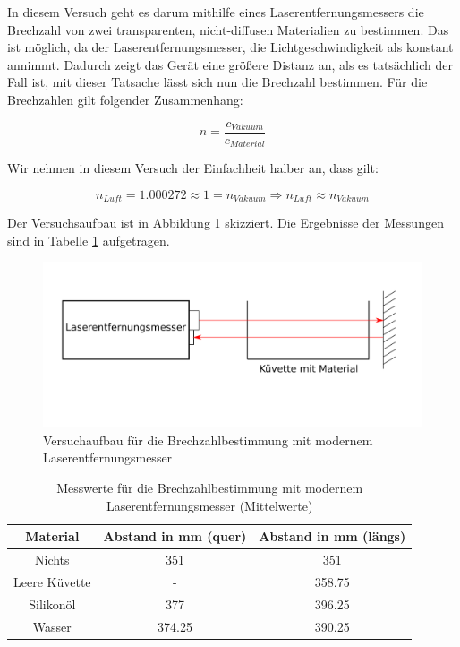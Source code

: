 In diesem Versuch geht es darum mithilfe eines Laserentfernungsmessers die Brechzahl von zwei transparenten, nicht-diffusen Materialien zu bestimmen. Das ist möglich, da der Laserentfernungsmesser, die Lichtgeschwindigkeit als konstant annimmt. Dadurch zeigt das Gerät eine größere Distanz an, als es tatsächlich der Fall ist, mit dieser Tatsache lässt sich nun die Brechzahl bestimmen. Für die Brechzahlen gilt folgender Zusammenhang:

\begin{equation}
    n = \frac{c_{Vakuum}}{c_{Material}}
\end{equation}

Wir nehmen in diesem Versuch der Einfachheit halber an, dass gilt:

\begin{equation}
    n_{Luft} = 1.000272 \approx 1 = n_{Vakuum} \Rightarrow n_{Luft} \approx n_{Vakuum}
\end{equation}

Der Versuchsaufbau ist in Abbildung \ref{fig:Laserentfernungsmesser} skizziert. Die Ergebnisse der Messungen sind in Tabelle \ref{tab:Messwerte Versuch 3 Lichtgeschwindigkeit} aufgetragen.

\begin{figure}[h]
    \centering
    \includegraphics[scale=0.6]{./fig/Laserentfernungsmesser.png}
    \caption{Versuchaufbau für die Brechzahlbestimmung mit modernem Laserentfernungsmesser}
    \label{fig:Laserentfernungsmesser}
\end{figure}

\begin{table}
    \centering
    \caption{Messwerte für die Brechzahlbestimmung mit modernem Laserentfernungsmesser (Mittelwerte)}
    \begin{tabular}{c c c}
    \hline
    Material & Abstand in mm (quer) & Abstand in mm (längs) \\
    \hline
    Nichts & 351 & 351 \\
    Leere Küvette & - & 358.75 \\
    Silikonöl & 377 & 396.25 \\
    Wasser & 374.25 & 390.25 \\
    \hline
    \end{tabular}
    \label{tab:Messwerte Versuch 3 Lichtgeschwindigkeit}
\end{table}

